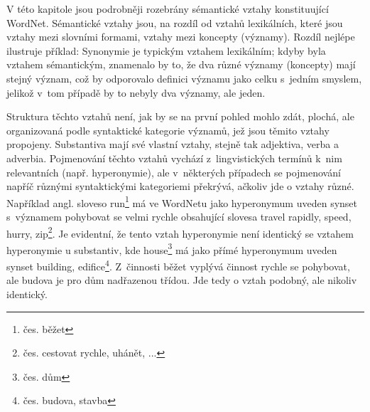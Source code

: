 \documentclass[a4paper,11pt,openany,twoside]{book}
\newcommand{\td}[2][]{
	{\hskip -0.5em\todo[size=\footnotesize]{#2}}
}
\newcommand\ex{\textsf}
\begin{document}







				V této kapitole jsou podrobněji rozebrány sémantické vztahy konstituující WordNet. Sémantické vztahy jsou, na rozdíl od vztahů lexikálních, které jsou vztahy mezi slovními formami, vztahy mezi koncepty (významy). Rozdíl nejlépe ilustruje příklad: Synonymie je typickým vztahem lexikálním; kdyby byla vztahem sémantickým, znamenalo by to, že dva různé významy (koncepty) mají stejný význam, což by odporovalo definici významu jako celku s~jedním smyslem, jelikož v~tom případě by to nebyly dva významy, ale jeden. 

				Struktura těchto vztahů není, jak by se na první pohled mohlo zdát, plochá, ale organizovaná podle syntaktické kategorie významů, jež jsou těmito vztahy propojeny. Substantiva mají své vlastní vztahy, stejně tak adjektiva, verba a adverbia. Pojmenování těchto vztahů vychází z~lingvistických termínů k~nim relevantních (např. hyperonymie), ale v~některých případech se pojmenování napříč různými syntaktickými kategoriemi překrývá, ačkoliv jde o vztahy různé. Například angl. sloveso \ex{run}\footnote{čes. \ex{běžet}} má ve WordNetu jako hyperonymum uveden synset s~významem \ex{pohybovat se velmi rychle} obsahující slovesa \ex{travel rapidly, speed, hurry, zip}\footnote{čes. \ex{cestovat rychle, uhánět, ...}}. Je evidentní, že tento vztah hyperonymie není identický se vztahem hyperonymie u substantiv, kde \ex{house}\footnote{čes. \ex{dům}} má jako přímé hyperonymum uveden synset \ex{building, edifice}\footnote{čes. \ex{budova, stavba}}. Z~činnosti \ex{běžet} vyplývá činnost \ex{rychle se pohybovat}, ale \ex{budova} je pro \ex{dům} nadřazenou třídou. Jde tedy o vztah podobný, ale nikoliv identický. \parencite{princetonWN}
\end{document}

